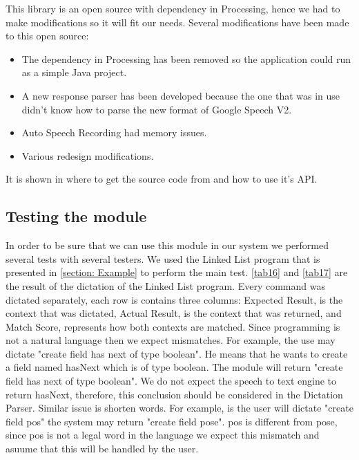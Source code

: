 This library is an open source with dependency in Processing, hence we had to make modifications so it will fit our needs. Several modifications have been made to this open source:
\begin{itemize}
	\item The dependency in Processing has been removed so the application could run as a simple Java project. 
	\item A new response parser has been developed because the one that was in use didn't know how to parse the new format of Google Speech V2.
	\item Auto Speech Recording had memory issues.
	\item Various redesign modifications.
\end{itemize}
It is shown in \citet{getflourish14} where to get the source code from and how to use it's API.
\subsection{Testing the module}
In order to be sure that we can use this module in our system we performed several tests with several testers. We used the Linked List program that is presented in \autoref{section: Example} to perform the main test. \ref{tab16} and \ref{tab17} are the result of the dictation of the Linked List program. Every command was dictated separately, each row is contains three columns: Expected Result, is the context that was dictated, Actual Result, is the context that was returned, and Match Score, represents how both contexts are matched. Since programming is not a natural language then we expect mismatches. For example, the use may dictate "create field has next of type boolean". He means that he wants to create a field named hasNext which is of type boolean. The module will return "create field has next of type boolean". We do not expect the speech to text engine to return hasNext, therefore, this conclusion should be considered in the Dictation Parser. Similar issue is shorten words. For example, is the user will dictate "create field pos" the system may return "create field pose". pos is different from pose, since pos is not a legal word in the language we expect this mismatch and asuume that this will be handled by the user. 


